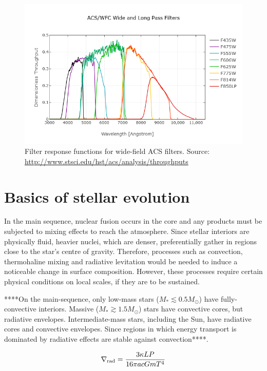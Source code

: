 \documentclass[12pt, a4paper]{report}
\begin{document}
\begin{figure}[h]
\begin{center}
\includegraphics[scale=0.5]{ACS_Wide.png}
\caption{Filter response functions for wide-field ACS filters. Source: \protect\url{http://www.stsci.edu/hst/acs/analysis/throughputs}}
\label{ACS_response_funcs}
\end{center}
\end{figure}

\section{Basics of stellar evolution} \label{stel_evol}
In the main sequence, nuclear fusion occurs in the core and any products must be subjected to mixing effects to reach the atmosphere. Since stellar interiors are physically fluid, heavier nuclei, which are denser, preferentially gather in regions close to the star's centre of gravity. Therefore, processes such as convection, thermohaline mixing and radiative levitation would be needed to induce a noticeable change in surface composition. However, these processes require certain physical conditions on local scales, if they are to be sustained. 

****On the main-sequence, only low-mass stars ($M_{*} \lesssim 0.5M_{\odot}$) have fully-convective interiors. Massive ($M_{*} \gtrsim 1.5M_{\odot}$) stars have convective cores, but radiative envelopes. Intermediate-mass stars, including the Sun, have radiative cores and convective envelopes. Since regions in which energy transport is dominated by radiative effects are stable against convection****.

\begin{equation}
\nabla_{\textnormal{rad}} = \frac{3\kappa LP}{16\pi acGmT^{4}}
\end{equation}
\end{document}
